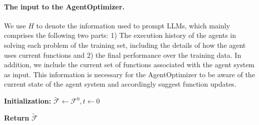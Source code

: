 \documentclass{article}
\theoremstyle{plain}
\theoremstyle{definition}
\theoremstyle{remark}
\begin{document}
\paragraph{The input to the AgentOptimizer.}

We use $H$ to denote the information used to prompt LLMs, which mainly comprises the following two parts:
1) The execution history of the agents in solving each problem of the training set, including the details of how the agent uses current functions and 
2) the final performance over the training data.
In addition, we include the current set of functions associated with the agent system as input.
This information is necessary for the AgentOptimizer to be aware of the current state of the agent system and accordingly suggest function updates.

\begin{algorithm}[htb!]\small
\captionsetup{font=small} 
\SetNoFillComment
\SetAlCapNameFnt{\small}
\SetAlCapFnt{\small}
\renewcommand{\baselinestretch}{0.5} 

\caption{Progressive Function Update (\texttt{AgentOptimizer.step})}
\label{alg:2}
\textbf{Initialization:} $\tilde{\mathcal{F}} \gets \mathcal{F}^{0}, t \gets 0$ 

\textbf{Return} $\tilde{\mathcal{F}}$
\end{algorithm}
\end{document}
